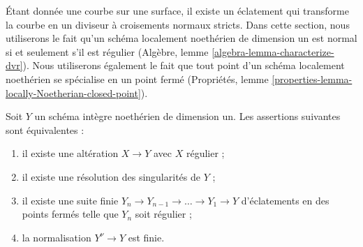 \noindent Étant donnée une courbe sur une surface, il existe un éclatement qui transforme la courbe en un diviseur à croisements normaux stricts. Dans cette section, nous utiliserons le fait qu'un schéma localement noethérien de dimension un est normal si et seulement s'il est régulier (Algèbre, lemme \ref{algebra-lemma-characterize-dvr}). Nous utiliserons également le fait que tout point d'un schéma localement noethérien se spécialise en un point fermé (Propriétés, lemme \ref{properties-lemma-locally-Noetherian-closed-point}).

\begin{lemma} \label{lemma-resolve-curve} Soit $Y$ un schéma intègre noethérien de dimension un. Les assertions suivantes sont équivalentes : \begin{enumerate} \item il existe une altération $X \to Y$ avec $X$ régulier ; \item il existe une résolution des singularités de $Y$ ; \item il existe une suite finie $Y_n \to Y_{n - 1} \to \ldots \to Y_1 \to Y$ d'éclatements en des points fermés telle que $Y_n$ soit régulier ; \item la normalisation $Y^\nu \to Y$ est finie. \end{enumerate} \end{lemma}

